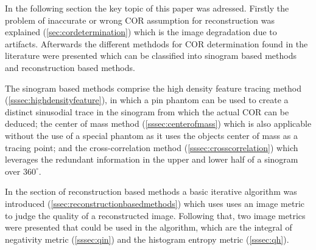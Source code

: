 \documentclass[10pt,journal,compsoc]{IEEEtran}
\begin{document}
In the following section the key topic of this paper was adressed.
Firstly the problem of inaccurate or wrong COR assumption for reconstruction was explained (\cref{sec:cordetermination}) which is the image degradation due to artifacts.
Afterwards the different methdods for COR determination found in the literature were presented which can be classified into sinogram based methods and reconstruction based methods.

The sinogram based methods comprise the high density feature tracing method (\cref{sssec:highdensityfeature}), in which a pin phantom can be used to create a distinct sinusodial trace in the sinogram from which the actual COR can be deduced;
the center of mass method (\cref{sssec:centerofmass}) which is also applicable without the use of a special phantom as it uses the objects center of mass as a tracing point;
and the cross-correlation method (\cref{sssec:crosscorrelation}) which leverages the redundant information in the upper and lower half of a sinogram over $360^\circ$.

In the section of reconstruction based methods a basic iterative algorithm was introduced (\cref{ssec:reconstructionbasedmethods}) which uses uses an image metric to judge the quality of a reconstructed image.
Following that, two image metrics were presented that could be used in the algorithm, which are the integral of negativity metric (\cref{sssec:qin}) and the histogram entropy metric (\cref{sssec:qh}).




%
\end{document}
